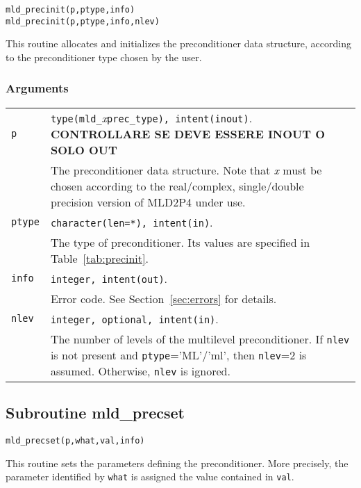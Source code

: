 \begin{center}
\verb|mld_precinit(p,ptype,info)| \\
\verb|mld_precinit(p,ptype,info,nlev)| \\
\end{center}

\noindent
This routine allocates and initializes the preconditioner data structure,
according to the preconditioner type chosen by the user.

\subsubsection*{Arguments}

\begin{tabular}{p{1.2cm}p{11.5cm}}
\verb|p|      & \verb|type(mld_|\emph{x}\verb|prec_type), intent(inout)|.
                \textbf{CONTROLLARE SE DEVE ESSERE INOUT O SOLO OUT}     \\
              & The preconditioner data structure. Note that \emph{x}
                must be chosen according to the real/complex, single/double
                precision version of MLD2P4 under use.\\
\verb|ptype|  & \verb|character(len=*), intent(in)|.\\
              & The type of preconditioner. Its values are specified in Table~\ref{tab:precinit}.\\
\verb|info|   & \verb|integer, intent(out)|.\\
              & Error code. See Section~\ref{sec:errors} for details.\\
\verb|nlev|   & \verb|integer, optional, intent(in)|.\\
              & The number of levels of the multilevel preconditioner.
                If \verb|nlev| is not present and \verb|ptype|='ML'/'ml', 
                then \verb|nlev|=2 is assumed. Otherwise, \verb|nlev| is ignored.
\end{tabular}


\subsection{Subroutine mld\_precset\label{sec:precset}}

\begin{center}
\verb|mld_precset(p,what,val,info)|\\
\end{center}

\noindent
This routine sets the parameters defining the preconditioner. More
precisely, the parameter identified by \verb|what| is assigned the value
contained in \verb|val|.

